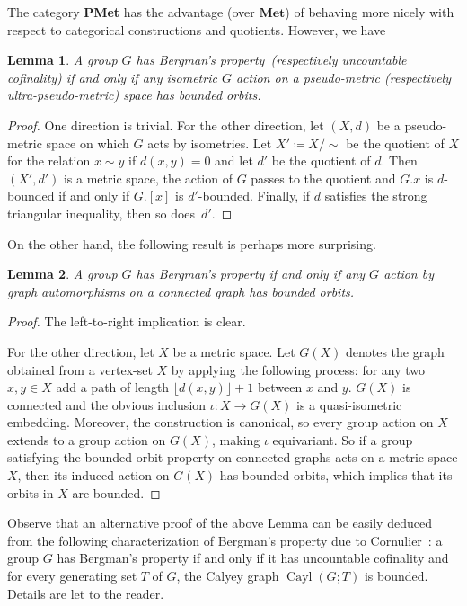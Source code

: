 \documentclass[a4paper]{article}
\newtheorem{lem}{Lemma}[section]
\theoremstyle{definition}
\DeclareMathOperator\Cayley{Cayl}
\newcommand*{\category}[1]{\textbf{#1}}
\newcommand*{\PMet}{\category{PMet}}
\newcommand*{\FW}{FW}
\begin{document}
The category \PMet{} has the advantage (over $\category{Met}$) of behaving more nicely with respect to categorical constructions and quotients.
However, we have
%
%
\begin{lem}\label{Lemma:BergQPMet}
A group $G$ has Bergman's property~(respectively uncountable cofinality) if and only if any isometric $G$ action on a pseudo-metric (respectively ultra-pseudo-metric) space has bounded orbits.
\end{lem}
\begin{proof}
One direction is trivial.
For the other direction, let $(X,d)$ be a pseudo-metric space on which $G$ acts by isometries.
Let $X'\coloneqq X/\sim$ be the quotient of $X$ for the relation $x\sim y$ if $d(x,y)=0$ and let $d'$ be the quotient of $d$.
Then $(X',d')$ is a metric space, the action of $G$ passes to the quotient and $G.x$ is $d$-bounded if and only if $G.[x]$ is $d'$-bounded.
Finally, if $d$ satisfies the strong triangular inequality, then so does~$d'$.
\end{proof}
%
%
On the other hand, the following result is perhaps more surprising.
%
%
\begin{lem}
A group $G$ has Bergman's property if and only if any $G$ action by graph automorphisms on a connected graph has bounded orbits.
\end{lem}
\begin{proof}
The left-to-right implication is clear.

%
For the other direction, let $X$ be a metric space. Let $G(X)$ denotes the graph obtained from a vertex-set $X$ by applying the following process: for any two $x, y\in X$ add a path of length $\lfloor d(x, y)\rfloor + 1$ between $x$ and $y$. $G(X)$ is connected and the obvious inclusion $\iota\colon X\to G(X)$ is a quasi-isometric embedding. Moreover, the construction is canonical, so every group action on $X$ extends to a group action on $G(X)$, making $\iota$ equivariant. So if a group satisfying the bounded orbit property on connected graphs acts on a metric space $X$, then its induced action on $G(X)$ has bounded orbits, which implies that its orbits in $X$ are bounded.
\end{proof}
%
%
Observe that an alternative proof of the above Lemma can be easily deduced from the following characterization of Bergman's property due to Cornulier~\cite{MR2240370}: a group $G$ has Bergman's property if and only if it has uncountable cofinality and for every generating set $T$ of $G$, the Calyey graph $\Cayley(G;T)$ is bounded.
Details are let to the reader.
\end{document}
